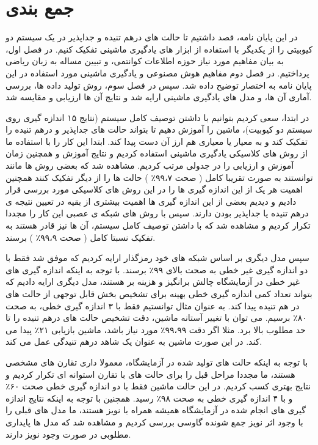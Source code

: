 \section{جمع بندی}
در این پایان نامه، قصد داشتیم تا حالت های درهم تنیده و جداپذیر در یک سیستم دو کیوبیتی را از یکدیگر با استفاده از ابزار های یادگیری ماشینی تفکیک کنیم. در فصل اول، به بیان مفاهیم مورد نیاز حوزه اطلاعات کوانتمی، و تبیین مساله به زبان ریاضی پرداختیم. در فصل دوم مفاهیم هوش مصنوعی و یادگیری ماشینی مورد استفاده در این پایان نامه به اختصار توضیح داده شد. سپس در فصل سوم، روش تولید داده ها، بررسی آماری آن ها، و مدل های یادگیری ماشینی ارایه شد و نتایج آن ها ارزیابی و مقایسه شد.


در ابتدا، سعی کردیم بتوانیم با داشتن توصیف کامل سیستم (نتایج ۱۵ اندازه گیری روی سیستم دو کیوبیت)، ماشین را آموزش دهیم تا بتواند حالت های جداپذیر و درهم تنیده را تفکیک کند و به معیار
یا معیاری هم ارز آن دست پیدا کند.
ابتدا این کار را با استفاده ما از روش های کلاسیکی یادگیری ماشینی استفاده کردیم و نتایج آموزش و همچنین زمان آموزش و ارزیابی را در جدولی مرتب کردیم. مشاهده شد که بعضی روش ها مانند
توانستند به صورت تقریبا کامل
(
صحت
۹۹،۷٪
)
حالت ها را از دیگر تفکیک کنند
همچنین اهمیت هر یک از این اندازه گیری ها را در این روش های کلاسیکی مورد بررسی قرار دادیم و دیدیم بعضی از این اندازه گیری ها اهمیت بیشتری از بقیه در تعیین نتیجه ی درهم تنیده یا جداپذیر بودن دارند.
سپس با روش های شبکه ی عصبی این کار را مجددا تکرار کردیم و مشاهده شد که با داشتن توصیف کامل سیستم، آن ها نیز قادر هستند به تفکیک نسبتا کامل
(
صحت
۹۹،۹٪
)
برسند.


سپس مدل دیگری بر اساس شبکه های خود رمزگذار ارایه کردیم که موفق شد فقط با دو اندازه گیری غیر خطی به صحت
بالای
۹۹٪
برسند. با توجه به اینکه اندازه گیری های غیر خطی در آزمایشگاه چالش برانگیز و هزینه بر هستند، مدل دیگری ارایه دادیم که بتواند تعداد کمی اندازه گیری خطی بهینه برای تشخیص بخش قابل توجهی از حالت های در هم تنیده پیدا کند. به عنوان مثال توانستیم فقط با ۳ اندازه گیری خطی، به صحت
۸۰٪
برسیم. می توان با تغییر آستانه ماشین، دقت تشخیص حالت های درهم تنیده را تا حد مطلوب بالا برد. مثلا اگر دقت
۹۹،۹۹٪
مورد نیاز باشد، ماشین بازیابی
۲۱٪
پیدا می کند. در این صورت ماشین به عنوان یک شاهد درهم تنیدگی عمل می کند.

با توجه به اینکه حالت های تولید شده در آزمایشگاه، معمولا داری تقارن های مشخصی هستند، ما مجددا مراحل قبل را برای حالت های با تقارن استوانه ای تکرار کردیم و نتایج بهتری کسب کردیم. در این حالت ماشین فقط با دو اندازه گیری خطی صحت
۶۰٪
و با ۴ اندازه گیری خطی
به صحت
۹۸٪
رسید. همچنین با توجه به اینکه نتایج اندازه گیری های انجام شده در آزمایشگاه همیشه همراه با نویز هستند، ما مدل های قبلی را با وجود اثر نویز جمع شونده گاوسی بررسی کردیم و مشاهده شد که مدل ها پایداری مطلوبی در صورت وجود نویز دارند.

